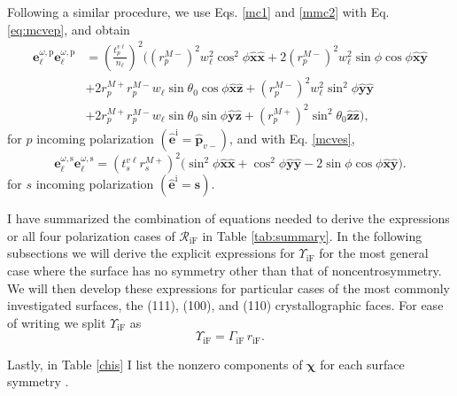 Following a similar procedure, we use Eqs. \eqref{mc1} and \eqref{mmc2} with Eq.
\eqref{eq:mcvep}, and obtain
\begin{equation}\label{eq:ewewpmr}
\begin{split}
\mathbf{e}^{\omega,\mathrm{p}}_{\ell}\mathbf{e}^{\omega,\mathrm{p}}_{\ell} &=
\left(\frac{t^{v\ell}_{p}}{n_{\ell}}\right)^{2}
\bigg(
   \left(r^{M-}_{p}\right)^{2}w^{2}_{\ell}\cos^{2}\phi
   \hat{\mathbf{x}}\hat{\mathbf{x}}
 + 2\left(r^{M-}_{p}\right)^{2}w^{2}_{\ell}\sin\phi\cos\phi
   \hat{\mathbf{x}}\hat{\mathbf{y}}\\
&+ 2r^{M+}_{p}r^{M-}_{p}w_{\ell}\sin\theta_{0}\cos\phi
   \hat{\mathbf{x}}\hat{\mathbf{z}}
 + \left(r^{M-}_{p}\right)^{2}w^{2}_{\ell}\sin^{2}\phi
   \hat{\mathbf{y}}\hat{\mathbf{y}}\\
&+ 2r^{M+}_{p}r^{M-}_{p}w_{\ell}\sin\theta_{0}\sin\phi
   \hat{\mathbf{y}}\hat{\mathbf{z}}
 + \left(r^{M+}_{p}\right)^{2}\sin^{2}\theta_{0}
   \hat{\mathbf{z}}\hat{\mathbf{z}}
\bigg),
\end{split}
\end{equation}
for $p$ incoming polarization $(\hat{\mathbf{e}}^{\mathrm{i}} =
\hat{\mathbf{p}}_{v-})$, and with Eq. \eqref{mcves},
\begin{equation}\label{eq:ewewsmr}
\mathbf{e}^{\omega,\mathrm{s}}_{\ell}\mathbf{e}^{\omega,\mathrm{s}}_{\ell}
= \left(t^{v\ell}_{s}r^{M+}_{s}\right)^{2}
\big(
  \sin^{2}\phi\hat{\mathbf{x}}\hat{\mathbf{x}}
 + \cos^{2}\phi\hat{\mathbf{y}}\hat{\mathbf{y}}
 - 2\sin\phi\cos\phi\hat{\mathbf{x}}\hat{\mathbf{y}}
\big).
\end{equation}
for $s$ incoming polarization $(\hat{\mathbf{e}}^{\mathrm{i}} =
\hat{\mathbf{s}})$.

I have summarized the combination of equations needed to derive the expressions
or all four polarization cases of $\mathcal{R}_{\mathrm{iF}}$ in Table
\ref{tab:summary}. In the following subsections we will derive the explicit
expressions for $\Upsilon_{\mathrm{iF}}$ for the most general case where the
surface has no symmetry other than that of noncentrosymmetry. We will then
develop these expressions for particular cases of the most commonly investigated
surfaces, the (111), (100), and (110) crystallographic faces. For ease of
writing we split $\Upsilon_{\mathrm{iF}}$ as
\begin{equation}\label{eq:mc25}
\Upsilon_{\mathrm{iF}} = \Gamma_{\mathrm{iF}}\,r_{\mathrm{iF}}.
\end{equation} 

Lastly, in Table \ref{chis} I list the nonzero components of $\boldsymbol{\chi}$
for each surface symmetry \cite{sipePRB87, popovbook}.

